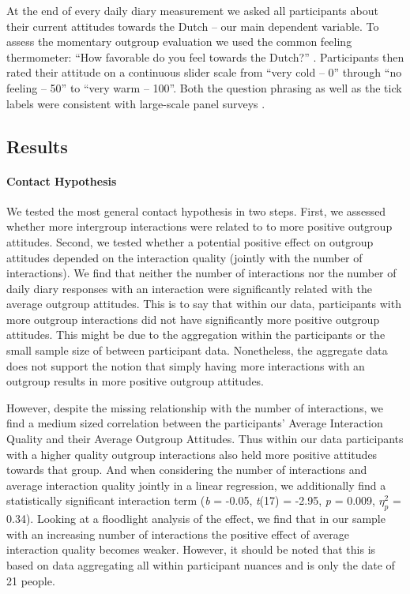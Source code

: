 At the end of every daily diary measurement we asked all participants
about their current attitudes towards the Dutch -- our main dependent
variable. To assess the momentary outgroup evaluation we used the common
feeling thermometer: ``How favorable do you feel towards the Dutch?''
\citep[][]{Lavrakas2008}. Participants then rated their attitude on a
continuous slider scale from ``very cold -- 0'' through ``no feeling --
50'' to ``very warm -- 100''. Both the question phrasing as well as the
tick labels were consistent with large-scale panel surveys
\citep[e.g.,][]{DeBell2010}.




\subsection{Results}

\paragraph{Contact Hypothesis}

We tested the most general contact hypothesis in two steps. First, we
assessed whether more intergroup interactions were related to to more
positive outgroup attitudes. Second, we tested whether a potential
positive effect on outgroup attitudes depended on the interaction
quality (jointly with the number of interactions). We find that neither
the number of interactions nor the number of daily diary responses with
an interaction were significantly related with the average outgroup
attitudes. This is to say that within our data, participants with more
outgroup interactions did not have significantly more positive outgroup
attitudes. This might be due to the aggregation within the participants
or the small sample size of between participant data. Nonetheless, the
aggregate data does not support the notion that simply having more
interactions with an outgroup results in more positive outgroup
attitudes.

However, despite the missing relationship with the number of
interactions, we find a medium sized correlation between the
participants' Average Interaction Quality and their Average Outgroup
Attitudes. Thus within our data participants with a higher quality
outgroup interactions also held more positive attitudes towards that
group. And when considering the number of interactions and average
interaction quality jointly in a linear regression, we additionally find
a statistically significant interaction term (\textit{b} = -0.05,
\textit{t}(17) = -2.95, \textit{p} = 0.009, \(\eta_p^2\) = 0.34).
Looking at a floodlight analysis of the effect, we find that in our
sample with an increasing number of interactions the positive effect of
average interaction quality becomes weaker. However, it should be noted
that this is based on data aggregating all within participant nuances
and is only the date of 21 people.

